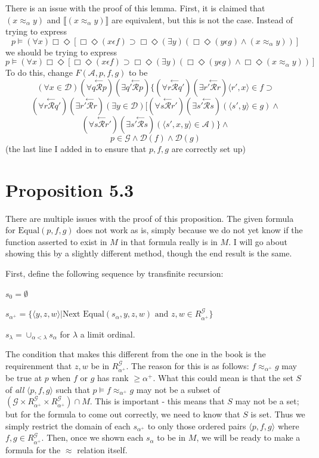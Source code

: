 \documentclass{article}
\newcommand{\lbc}{\llbracket}
\newcommand{\rbc}{\rrbracket}
\newcommand{\ltop}[1]{\stackrel{\leftarrow}{#1}}
\theoremstyle{definition}
\begin{document}
There is an issue with the proof of this lemma. First, it is claimed that $(x\approx_\alpha y)$ and 
$\lbc (x\approx_\alpha y)\rbc$ are equivalent, but this is not the case. Instead of trying to express
\[ p\vDash(\forall x)\Box\Diamond[\Box\Diamond(x\epsilon f)\supset\Box\Diamond(\exists y)(\Box\Diamond(y\epsilon g)\wedge (x\approx_\alpha y))] \]
we should be trying to express
\[ p\vDash(\forall x)\Box\Diamond[\Box\Diamond(x\epsilon f)\supset\Box\Diamond(\exists y)(\Box\Diamond(y\epsilon g)\wedge\Box\Diamond(x\approx_\alpha y))] \]
To do this, change $F(\mathcal{A},p,f,g)$ to be
\[ (\forall x\in\mathcal{D})(\forall q\ltop{\mathcal{R}}p)(\exists q'\ltop{\mathcal{R}}p)\{(\forall r\ltop{\mathcal{R}}q')(\exists r'\ltop{\mathcal{R}}r)\langle r',x\rangle\in f\supset \]
\[ (\forall r\ltop{\mathcal{R}}q')(\exists r'\ltop{\mathcal{R}}r)(\exists y\in\mathcal{D})[(\forall s\ltop{\mathcal{R}}r')(\exists s'\ltop{\mathcal{R}}s)(\langle s',y\rangle\in g)\wedge \]
\[ (\forall s\ltop{\mathcal{R}}r')(\exists s'\ltop{\mathcal{R}}s)(\langle s',x,y\rangle\in\mathcal{A})\}\wedge \]
\[ p\in\mathcal{G}\wedge\mathcal{D}(f)\wedge\mathcal{D}(g) \]
(the last line I added in to ensure that $p,f,g$ are correctly set up)

\section*{Proposition 5.3}
There are multiple issues with the proof of this proposition. The given formula for 
$\textrm{Equal}(p,f,g)$ does not work as is, simply because we do not yet know if the function 
asserted to exist in $M$ in that formula really is in $M$. I will go about showing this by a slightly different method, 
though the end result is the same.

First, define the following sequence by transfinite recursion:

$s_0=\emptyset$

$s_{\alpha^+}=\{\langle y,z,w\rangle|\textrm{Next Equal}(s_\alpha,y,z,w)\textrm{ and }z,w\in R^\mathcal{G}_{\alpha^+}\}$

$s_\lambda=\cup_{\alpha<\lambda}s_\alpha$ for $\lambda$ a limit ordinal.

The condition that makes this different from the one in the book is the requirenment that $z,w$ be in 
$R^\mathcal{G}_{\alpha^+}$. The reason for this is as follows: 
$f\approx_{\alpha^+} g$ may be true at $p$ when $f$ or $g$ has rank $\ge\alpha^+$. What this could mean is that 
the set $S$ of \textit{all} $\langle p,f,g\rangle$ such that $p\vDash f\approx_{\alpha^+}g$ may not be a subset of 
$(\mathcal{G}\times R^\mathcal{G}_{\alpha^+}\times R^\mathcal{G}_{\alpha^+})\cap M$. This is important - this means 
that $S$ may not be a set; but for the formula to come out correctly, we need to know that $S$ is set. Thus we 
simply restrict the domain of each $s_{\alpha^+}$ to only those ordered pairs $\langle p,f,g\rangle$ where 
$f,g\in R^\mathcal{G}_{\alpha^+}$. Then, once we shown each $s_\alpha$ to be in $M$, we will be ready to 
make a formula for the $\approx$ relation itself.
\end{document}
